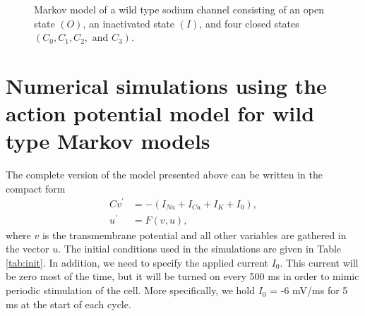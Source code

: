 \begin{figure}[ptb]
\begin{center}
\end{center}
\caption{Markov model of a wild type sodium channel consisting of an open
state $(O)$, an inactivated state $(I)$, and four closed states $(C_{0}%
,C_{1},C_{2}, \text{ and }C_{3})$. }%
\label{wtreac3331}%
\end{figure}


\section[Numerical action potential; wild type]{Numerical simulations using the action potential model for wild type Markov models}

The complete version of the model presented above can be written in the compact form
\begin{align}
Cv^{\prime}  & =-\left(  I_{Na}+I_{Ca}+I_{K}+I_{0}\right),  \label{s401}\\
u^{\prime}  & =F(v,u)\label{s402},%
\end{align}
where $v$ is the transmembrane potential and all other variables are gathered in the vector $u$. The initial conditions used in the simulations are given in Table \ref{tab:init}. In addition, we need to specify the applied current $I_0$. This current will be zero most of the time, but it will be turned on every 500 ms in order to mimic periodic stimulation of the cell. More specifically, 
we hold $I_0$ = -6 mV/ms for 5 ms at the start of each cycle.

